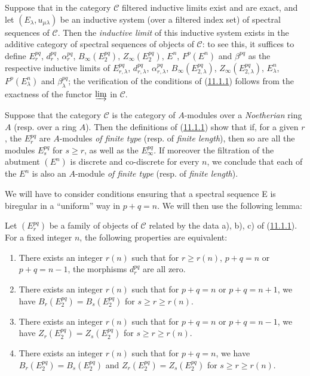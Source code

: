 \begin{env}[11.1.7]
\label{0.11.1.7}
Suppose that in the category $\mathcal C$ filtered inductive limits
exist and are exact, and let $(E_\lambda,u_{\mu\lambda})$ be an
inductive system (over a filtered index set) of spectral sequences of
$\mathcal C$. Then the \emph{inductive limit} of this inductive system exists
in the additive category of spectral sequences of objects of $\mathcal C$:
to see this, it suffices to define $E_r^{pq}$, $d_r^{pq}$, $\alpha_r^{pq}$,
$B_\infty(E_2^{pq})$, $Z_\infty(E_2^{pq})$, $E^n$, $F^p(E^n)$ and
$\beta^{pq}$ as the respective inductive limits of $E_{r,\lambda}^{pq}$,
$d_{r,\lambda}^{pq}$, $\alpha_{r,\lambda}^{pq}$,
$B_\infty(E_{2,\lambda}^{pq})$, $Z_\infty(E_{2,\lambda}^{pq})$,
$E_\lambda^n$, $F^p(E_\lambda^n)$ and $\beta_\lambda^{pq}$; the verification
of the conditions of (\hyperref[0.11.1.1]{11.1.1}) follows from the exactness of the
functor $\varinjlim$ in $\mathcal C$.
\end{env}

\begin{remark}[11.1.8]
\label{0.11.1.8}
Suppose that the category $\mathcal C$ is the category of $A$-modules over
a \emph{Noetherian} ring $A$ (resp. over a ring $A$). Then the
definitions of (\hyperref[0.11.1.1]{11.1.1}) show that if, for a given $r$,
the $E_r^{pq}$ are $A$-modules \emph{of finite type} (resp. of
\emph{finite length}), then so are all the modules $E_s^{pq}$ for
$s\geq r$, as well as the $E_\infty^{pq}$. If moreover the filtration of
the abutment $(E^n)$ is discrete and co-discrete for every $n$, we
conclude that each of the $E^n$ is also an $A$-module \emph{of finite type}
(resp. of \emph{finite length}).
\end{remark}

\begin{env}[11.1.9]
\label{0.11.1.9}
We will have to consider conditions ensuring that a spectral sequence E is
biregular in a ``uniform'' way in $p+q=n$. We will then use the following
lemma:
\end{env}

\begin{lemma}[11.1.10]
\label{0.11.1.10}
Let $(E_r^{pq})$ be a family of objects of $\mathcal C$ related by the data
a), b), c) of (\hyperref[0.11.1.1]{11.1.1}). For a fixed integer $n$, the
following properties are equivalent:
\begin{enumerate}
  \item[(a)] There exists an integer $r(n)$ such that for $r\geq r(n)$,
    $p+q=n$ or $p+q=n-1$, the morphisms $d_r^{pq}$ are all zero.
  \item[(b)] There exists an integer $r(n)$ such that for $p+q=n$ or $p+q=n+1$,
    we have $B_r(E_2^{pq})=B_s(E_2^{pq})$ for $s\geq r\geq r(n)$.
  \item[(c)] There exists an integer $r(n)$ such that for $p+q=n$ or $p+q=n-1$,
    we have $Z_r(E_2^{pq})=Z_s(E_2^{pq})$ for $s\geq r\geq r(n)$.
  \item[(d)] There exists an integer $r(n)$ such that for $p+q=n$, we have
    $B_r(E_2^{pq})=B_s(E_2^{pq})$ and $Z_r(E_2^{pq})=Z_s(E_2^{pq})$ for
    $s\geq r\geq r(n)$.
\end{enumerate}
\end{lemma}

